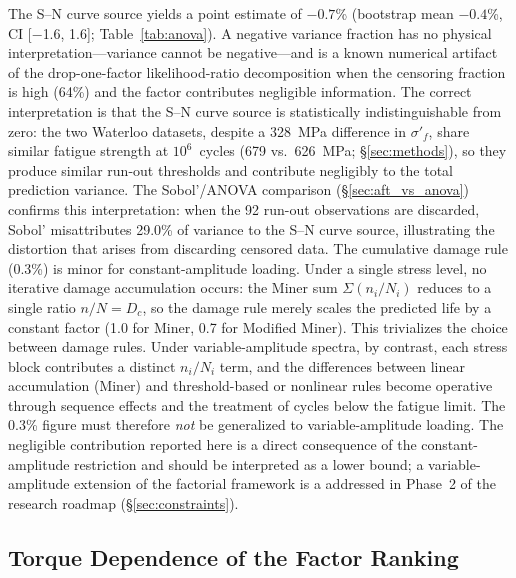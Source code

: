 \documentclass[12pt,a4paper]{article}
\begin{document}
The S--N curve source yields a point estimate of $-0.7$\% (bootstrap
mean $-0.4$\%, CI [$-$1.6, 1.6]; Table~\ref{tab:anova}). A negative
variance fraction has no physical interpretation---variance cannot be
negative---and is a known numerical artifact of the
drop-one-factor likelihood-ratio decomposition when the censoring
fraction is high (64\%) and the factor contributes negligible
information. The correct interpretation is that the S--N curve source
is statistically indistinguishable from zero: the two Waterloo
datasets, despite a 328~MPa difference in $\sigma'_f$, share similar
fatigue strength at $10^6$~cycles (679 vs.\ 626~MPa; \S\ref{sec:methods}),
so they produce similar run-out thresholds and contribute negligibly
to the total prediction variance. The Sobol'/ANOVA comparison
(\S\ref{sec:aft_vs_anova}) confirms this interpretation: when the 92
run-out observations are discarded, Sobol' misattributes 29.0\% of
variance to the S--N curve source, illustrating the distortion that
arises from discarding censored data. The cumulative damage rule
(0.3\%) is minor for constant-amplitude loading. Under a single
stress level,
no iterative damage accumulation occurs: the Miner sum
$\Sigma(n_i/N_i)$ reduces to a single ratio $n/N = D_c$, so the
damage rule merely scales the predicted life by a constant factor
(1.0 for Miner, 0.7 for Modified Miner). This trivializes the
choice between damage rules. Under variable-amplitude spectra,
by contrast, each stress block contributes a distinct $n_i/N_i$
term, and the differences between linear accumulation (Miner) and
threshold-based or nonlinear rules become operative through sequence
effects and the treatment of cycles below the fatigue limit. The
0.3\% figure must therefore \emph{not} be generalized to
variable-amplitude loading.
The negligible contribution reported here is a direct consequence of
the constant-amplitude restriction and should be interpreted as a
lower bound; a variable-amplitude extension of the factorial
framework is a addressed in Phase~2 of the research roadmap (\S\ref{sec:constraints}).

\subsection{Torque Dependence of the Factor Ranking}
\label{sec:torque}
\end{document}
